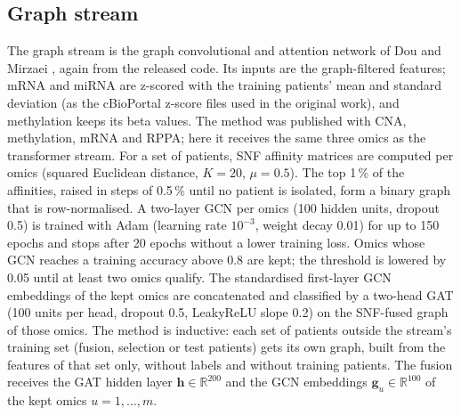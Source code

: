 \documentclass[conference]{IEEEtran}
\begin{document}
\subsection{Graph stream}
The graph stream is the graph convolutional and attention network of Dou and Mirzaei \cite{dou2025mogcan}, again from
the released code. Its inputs are the graph-filtered features; mRNA and miRNA are z-scored with the training patients'
mean and standard deviation (as the cBioPortal z-score files used in the original work), and methylation keeps its beta
values. The method was published with CNA, methylation, mRNA and RPPA;
here it receives the same three omics as the transformer stream. For a set of patients, SNF \cite{wang2014snf} affinity
matrices are computed per omics (squared Euclidean distance, $K=20$, $\mu=0.5$). The top 1\,\% of the affinities, raised
in steps of 0.5\,\% until no patient is isolated, form a binary graph that is row-normalised. A two-layer GCN
\cite{kipf2017gcn} per omics (100 hidden units, dropout 0.5) is trained with Adam (learning rate $10^{-3}$, weight decay
0.01) for up to 150 epochs and stops after 20 epochs without a lower training loss. Omics whose GCN reaches a training
accuracy above 0.8 are kept; the threshold is lowered by 0.05 until at least two omics qualify. The standardised
first-layer GCN embeddings of the kept omics are concatenated and classified by a two-head GAT \cite{velickovic2018gat}
(100 units per head, dropout 0.5, LeakyReLU slope 0.2) on the SNF-fused graph of those omics. The method is inductive:
each set of patients outside the stream's training set (fusion, selection or test patients) gets its own graph, built
from the features of that set only, without labels and without training patients. The fusion receives the GAT hidden
layer $\mathbf{h}\in\mathbb{R}^{200}$ and the GCN embeddings $\mathbf{g}_u\in\mathbb{R}^{100}$ of the kept omics
$u=1,\dots,m$.
\end{document}
